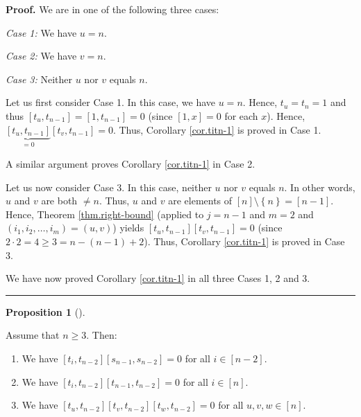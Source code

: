\documentclass[numbers=enddot,12pt,final,onecolumn,notitlepage]{scrartcl}%
\theoremstyle{definition}
\newtheorem{prop}[theo]{Proposition}
\newenvironment{proposition}[1][]
{\begin{prop}[#1]\begin{leftbar}}
{\end{leftbar}\end{prop}}
\newenvironment{proof}[1][Proof]{\noindent\textbf{#1.} }{\ \rule{0.5em}{0.5em}}
\begin{document}
\begin{proof}
We are in one of the following three cases:

\textit{Case 1:} We have $u=n$.

\textit{Case 2:} We have $v=n$.

\textit{Case 3:} Neither $u$ nor $v$ equals $n$.

Let us first consider Case 1. In this case, we have $u=n$. Hence, $t_{u}%
=t_{n}=1$ and thus $\left[  t_{u},t_{n-1}\right]  =\left[  1,t_{n-1}\right]
=0$ (since $\left[  1,x\right]  =0$ for each $x$). Hence, $\underbrace{\left[
t_{u},t_{n-1}\right]  }_{=0}\left[  t_{v},t_{n-1}\right]  =0$. Thus, Corollary
\ref{cor.titn-1} is proved in Case 1.

A similar argument proves Corollary \ref{cor.titn-1} in Case 2.

Let us now consider Case 3. In this case, neither $u$ nor $v$ equals $n$. In
other words, $u$ and $v$ are both $\neq n$. Thus, $u$ and $v$ are elements of
$\left[  n\right]  \setminus\left\{  n\right\}  =\left[  n-1\right]  $. Hence,
Theorem \ref{thm.right-bound} (applied to $j=n-1$ and $m=2$ and $\left(
i_{1},i_{2},\ldots,i_{m}\right)  =\left(  u,v\right)  $) yields $\left[
t_{u},t_{n-1}\right]  \left[  t_{v},t_{n-1}\right]  =0$ (since $2\cdot
2=4\geq3=n-\left(  n-1\right)  +2$). Thus, Corollary \ref{cor.titn-1} is
proved in Case 3.

We have now proved Corollary \ref{cor.titn-1} in all three Cases 1, 2 and 3.
\end{proof}

\begin{proposition}
\label{prop.tn-2-three}Assume that $n\geq3$. Then:

\begin{enumerate}
\item[\textbf{(a)}] We have $\left[  t_{i},t_{n-2}\right]  \left[
s_{n-1},s_{n-2}\right]  =0$ for all $i\in\left[  n-2\right]  $.

\item[\textbf{(b)}] We have $\left[  t_{i},t_{n-2}\right]  \left[
t_{n-1},t_{n-2}\right]  =0$ for all $i\in\left[  n\right]  $.

\item[\textbf{(c)}] We have $\left[  t_{u},t_{n-2}\right]  \left[
t_{v},t_{n-2}\right]  \left[  t_{w},t_{n-2}\right]  =0$ for all $u,v,w\in
\left[  n\right]  $.
\end{enumerate}
\end{proposition}
\end{document}
